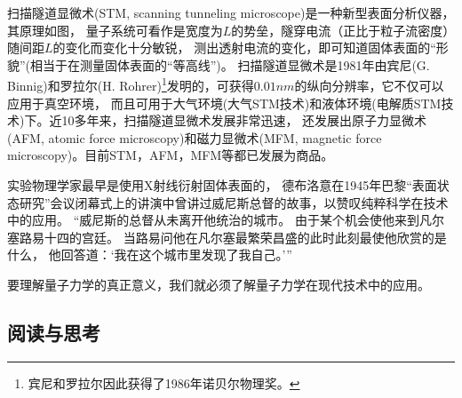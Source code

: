 
扫描隧道显微术(STM, scanning tunneling microscope)是一种新型表面分析仪器，其原理如图，
量子系统可看作是宽度为$L$的势垒，隧穿电流（正比于粒子流密度）随间距$L$的变化而变化十分敏锐，
测出透射电流的变化，即可知道固体表面的``形貌''(相当于在测量固体表面的``等高线'')。
扫描隧道显微术是1981年由宾尼(G. Binnig)和罗拉尔(H. Rohrer)\footnote{宾尼和罗拉尔因此获得了1986年诺贝尔物理奖。}发明的，可获得$0.01nm$的纵向分辨率，它不仅可以应用于真空环境，
而且可用于大气环境(大气STM技术)和液体环境(电解质STM技术)下。近10多年来，扫描隧道显微术发展非常迅速，
还发展出原子力显微术(AFM, atomic force microscopy)和磁力显微术(MFM, magnetic force microscopy)。目前STM，AFM，MFM等都已发展为商品。

实验物理学家最早是使用X射线衍射固体表面的，
德布洛意在1945年巴黎``表面状态研究''会议闭幕式上的讲演中曾讲过威尼斯总督的故事，以赞叹纯粹科学在技术中的应用。
``威尼斯的总督从未离开他统治的城市。
由于某个机会使他来到凡尔塞路易十四的宫廷。
当路易问他在凡尔塞最繁荣昌盛的此时此刻最使他欣赏的是什么，
他回答道：`我在这个城市里发现了我自己。'''


要理解量子力学的真正意义，我们就必须了解量子力学在现代技术中的应用。



\subsection*{阅读与思考}

